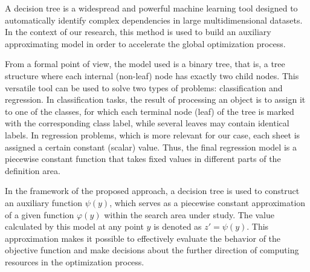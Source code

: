 \documentclass[runningheads]{llncs}
\begin{document}


A decision tree is a widespread and powerful machine learning tool designed to automatically identify complex dependencies in large multidimensional datasets. In the context of our research, this method is used to build an auxiliary approximating model in order to accelerate the global optimization process.

From a formal point of view, the model used is a binary tree, that is, a tree structure where each internal (non-leaf) node has exactly two child nodes. This versatile tool can be used to solve two types of problems: classification and regression. In classification tasks, the result of processing an object is to assign it to one of the classes, for which each terminal node (leaf) of the tree is marked with the corresponding class label, while several leaves may contain identical labels. In regression problems, which is more relevant for our case, each sheet is assigned a certain constant (scalar) value. Thus, the final regression model is a piecewise constant function that takes fixed values in different parts of the definition area.

In the framework of the proposed approach, a decision tree is used to construct an auxiliary function $\psi(y)$, which serves as a piecewise constant approximation of a given function $\varphi(y)$ within the search area under study. The value calculated by this model at any point $y$ is denoted as $z' = \psi(y)$. This approximation makes it possible to effectively evaluate the behavior of the objective function and make decisions about the further direction of computing resources in the optimization process.
\end{document}
